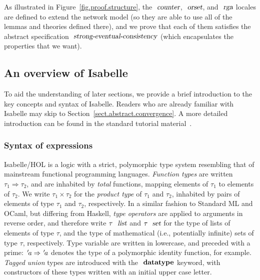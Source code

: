 As illustrated in Figure~\ref{fig.proof.structure}, the $\isa{counter}$, $\isa{orset}$, and $\isa{rga}$ locales are defined to extend the network model (so they are able to use all of the lemmas and theories defined there), and we prove that each of them satisfies the abstract specification $\isa{strong-eventual-consistency}$ (which encapsulates the properties that we want).

\subsection{An overview of Isabelle}
\label{subsect.an.overview.of.isabelle}

To aid the understanding of later sections, we provide a brief introduction to the key concepts and syntax of Isabelle.
Readers who are already familiar with Isabelle may skip to Section~\ref{sect.abstract.convergence}.
A more detailed introduction can be found in the standard tutorial material~\cite{DBLP:books/sp/NipkowK14}.

\subsubsection{Syntax of expressions}\label{sect.isabelle.syntax}

Isabelle/HOL is a logic with a strict, polymorphic type system resembling that of mainstream functional programming languages.
\emph{Function types} are written $\tau_1 \Rightarrow \tau_2$, and are inhabited by \emph{total} functions, mapping elements of $\tau_1$ to elements of $\tau_2$.
We write $\tau_1 \times \tau_2$ for the \emph{product type} of $\tau_1$ and $\tau_2$, inhabited by pairs of elements of type $\tau_1$ and $\tau_2$, respectively.
In a similar fashion to Standard ML and OCaml, but differing from Haskell, \emph{type operators} are applied to arguments in reverse order, and therefore write $\tau\ \isa{list}$ and $\tau\ \isa{set}$ for the type of lists of elements of type $\tau$, and the type of mathematical (i.e., potentially infinite) sets of type $\tau$, respectively.
Type variable are written in lowercase, and preceded with a prime: ${\emph{$\mskip2mu{'}\mskip-2mu$}}a \Rightarrow {\emph{$\mskip2mu{'}\mskip-2mu$}}a$ denotes the type of a polymorphic identity function, for example.
\emph{Tagged union} types are introduced with the $\isacommand{datatype}$ keyword, with constructors of these types written with an initial upper case letter.

